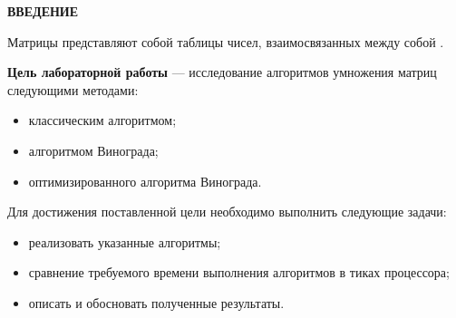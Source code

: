 \begin{center}
    \textbf{ВВЕДЕНИЕ}
\end{center}

Матрицы представляют собой таблицы чисел, взаимосвязанных между собой \cite{bib0}.

\textbf{Цель лабораторной работы} --- исследование алгоритмов умножения матриц следующими
методами:
\begin{itemize}
    \item классическим алгоритмом;
    \item алгоритмом Винограда;
    \item оптимизированного алгоритма Винограда.
\end{itemize}

Для достижения поставленной цели необходимо выполнить следующие задачи:
\begin{itemize}
    \item реализовать указанные алгоритмы;
    \item сравнение требуемого времени выполнения алгоритмов в тиках процессора;
    \item описать и обосновать полученные результаты.
\end{itemize}

